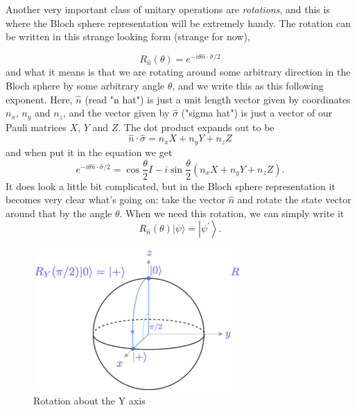 Another very important class of unitary operations are \emph{rotations}, and this is where the Bloch sphere representation will be extremely handy. The rotation can be written in this strange looking form (strange for now),

\begin{equation}
R_{\hat{n}}(\theta)=e^{-i \theta \hat{n} \cdot \hat{\sigma} / 2}
\end{equation}
and what it means is that we are rotating around some arbitrary direction in the Bloch sphere by some arbitrary angle $\theta$, and we write this as this following exponent. Here, $\hat{n}$ (read "n hat") is just a unit length vector given by coordinates $n_x$, $n_y$ and $n_z$, and the vector given by $\hat{\sigma}$ ("sigma hat") is just a vector of our Pauli matrices $X$, $Y$ and $Z$.  The dot product expands out to be
\begin{equation}
      \hat{n} \cdot \hat{\sigma} = n_{x} X+n_{y} Y+n_{z} Z
\end{equation}
and when put it in the equation we get
\begin{equation}
e^{-i \theta \hat{n} \cdot \hat{\sigma} / 2 }=\cos \frac{\theta}{2} I-i \sin \frac{\theta}{2}\left(n_{x} X+n_{y} Y+n_{z} Z\right).
\end{equation}
It does look a little bit complicated, but in the Bloch sphere representation it becomes very clear what's going on: take the vector $\hat{n}$ and rotate the state vector around that by the angle $\theta$. When we need this rotation, we can simply write it
\begin{equation}
R_{\hat{n}}(\theta)|\psi\rangle=\left|\psi^{\prime}\right\rangle.
\end{equation}




\begin{figure}[H]
    \centering
    \includegraphics[width=0.7\textwidth]{lesson2/bloch_y_axis.pdf}
    
        \caption{Rotation about the Y axis}
    
    \label{fig:y-rot}
\end{figure}

